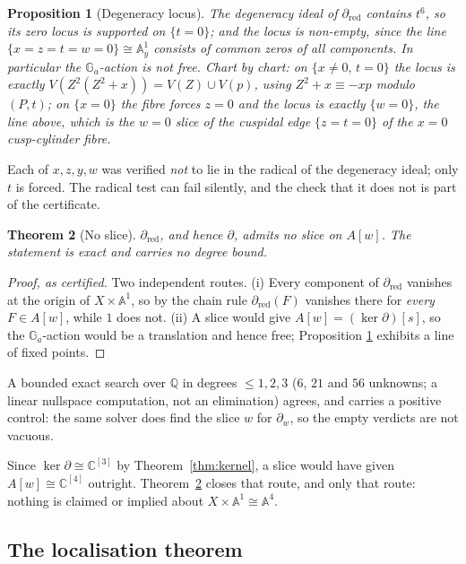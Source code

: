 \documentclass[11pt]{article}
\newtheorem{theorem}{Theorem}[section]
\newtheorem{proposition}[theorem]{Proposition}
\theoremstyle{definition}
\theoremstyle{remark}
\newcommand{\C}{\mathbb{C}}
\newcommand{\Q}{\mathbb{Q}}
\newcommand{\Aff}[1]{\mathbb{A}^{#1}}
\newcommand{\Ga}{\mathbb{G}_a}
\begin{document}
\begin{proposition}[Degeneracy locus]\label{prop:degeneracy}
The degeneracy ideal of $\partial_{\mathrm{red}}$ contains $t^6$, so its zero
locus is supported on $\{t=0\}$; and the locus is non-empty, since the line
$\{x=z=t=w=0\}\cong\Aff{1}_y$ consists of common zeros of all components. In
particular the $\Ga$-action is \emph{not free}. Chart by chart: on
$\{x\ne0,\,t=0\}$ the locus is exactly $V(Z^2(Z^2+x))=V(Z)\cup V(p)$, using
$Z^2+x\equiv-xp$ modulo $(P,t)$; on $\{x=0\}$ the fibre forces $z=0$ and the
locus is exactly $\{w=0\}$, the line above, which is the $w=0$ slice of the
cuspidal edge $\{z=t=0\}$ of the $x=0$ cusp-cylinder fibre.
\end{proposition}

Each of $x,z,y,w$ was verified \emph{not} to lie in the radical of the
degeneracy ideal; only $t$ is forced. The radical test can fail silently, and
the check that it does not is part of the certificate.

\begin{theorem}[No slice]\label{thm:noslice}
$\partial_{\mathrm{red}}$, and hence $\partial$, admits no slice on $A[w]$.
The statement is exact and carries no degree bound.
\end{theorem}

\begin{proof}[Proof, as certified]
Two independent routes. (i) Every component of $\partial_{\mathrm{red}}$
vanishes at the origin of $X\times\Aff{1}$, so by the chain rule
$\partial_{\mathrm{red}}(F)$ vanishes there for \emph{every} $F\in A[w]$,
while $1$ does not. (ii) A slice would give $A[w]=(\ker\partial)[s]$, so the
$\Ga$-action would be a translation and hence free; Proposition
\ref{prop:degeneracy} exhibits a line of fixed points.
\end{proof}

A bounded exact search over $\Q$ in degrees $\le1,2,3$ ($6$, $21$ and $56$
unknowns; a linear nullspace computation, not an elimination) agrees, and
carries a positive control: the same solver does find the slice $w$ for
$\partial_w$, so the empty verdicts are not vacuous.

Since $\ker\partial\cong\C^{[3]}$ by Theorem~\ref{thm:kernel}, a slice would
have given $A[w]\cong\C^{[4]}$ outright. Theorem~\ref{thm:noslice} closes that
route, and only that route: nothing is claimed or implied about
$X\times\Aff{1}\cong\Aff{4}$.

\subsection{The localisation theorem}
\end{document}
